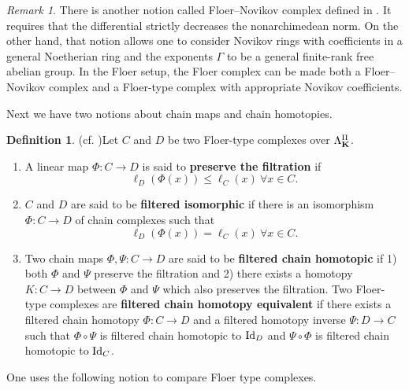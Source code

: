 \documentclass[reqno, 10pt]{amsart}
\numberwithin{equation}{section}
\numberwithin{equation}{section}
\theoremstyle{definition}
\newtheorem{defn}[thm]{Definition}
\theoremstyle{remark}
\newtheorem{rem}[thm]{Remark}
\newcommand{\beqn}{\begin{equation*}}
\newcommand{\eeqn}{\end{equation*}}
\begin{document}
\begin{rem}
There is another notion called Floer--Novikov complex defined in \cite{Usher_2008}. It requires that the differential strictly decreases the nonarchimedean norm. On the other hand, that notion allows one to consider Novikov rings with coefficients in a general Noetherian ring and the exponents $\Gamma$ to be a general finite-rank free abelian group. In the Floer setup, the Floer complex can be made both a Floer--Novikov complex and a Floer-type complex with appropriate Novikov coefficients.
\end{rem}

Next we have two notions about chain maps and chain homotopies.



\begin{defn}(cf. \cite[Definition 4.5]{Usher_Zhang_2016})\label{defn_filtered_chain_map}
Let $C$ and $D$ be two Floer-type complexes over $\Lambda_{\bf K}^\Pi$. 
\begin{enumerate}

\item A linear map $\Phi: C \to D$ is said to {\bf preserve the filtration} if 
\beqn
\ell_D(\Phi(x)) \leq \ell_C(x)\ \forall x\in C.
\eeqn

\item $C$ and $D$ are said to be {\bf filtered isomorphic} if there is an isomorphism $\Phi: C \to D$ of chain complexes such that 
\beqn
\ell_D(\Phi(x)) = \ell_C(x)\ \forall x \in C.
\eeqn

\item Two chain maps $\Phi, \Psi: C \to D$ are said to be {\bf filtered chain homotopic} if 1) both $\Phi$ and $\Psi$ preserve the filtration and 2) there exists a homotopy $K: C \to D$ between $\Phi$ and $\Psi$ which also preserves the filtration. Two Floer-type complexes are {\bf filtered chain homotopy equivalent} if there exists a filtered chain homotopy $\Phi: C \to D$ and a filtered homotopy inverse $\Psi: D \to C$ such that $\Phi \circ \Psi$ is filtered chain homotopic to ${\rm Id}_D$ and $\Psi \circ \Phi$ is filtered chain homotopic to ${\rm Id}_C$.


\end{enumerate}
\end{defn}




One uses the following notion to compare Floer type complexes. 
\end{document}
